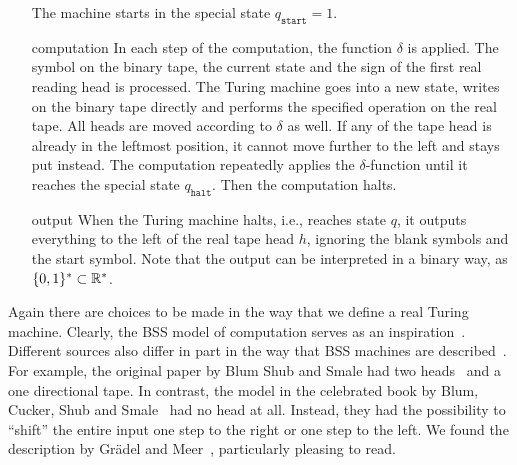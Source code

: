 \documentclass{article}
\begin{document}
\begin{definition}
\begin{itemize}[leftmargin=2cm]
    The machine starts in the special state $q_{\texttt{start}}= 1$.
    \item[computation]
    In each step of the computation, the function $\delta$ is applied.
    The symbol on the binary tape, the current state and the sign of the first real reading head is processed.
    The Turing machine goes into a new state, writes on the binary tape directly and performs the specified operation on the real tape.
    All heads are moved according to $\delta$ as well.
    If any of the tape head is already in the leftmost 
    position, it cannot move further to the left and stays put instead.
    The computation repeatedly applies the $\delta$-function until it reaches the special state $q_\texttt{halt}$.
    Then the computation halts.
    \item[output]
    When the Turing machine halts, i.e., reaches state $q$, it outputs everything to the left of the real tape head $h$, ignoring the blank symbols and the start symbol.
    Note that the output can be interpreted in a binary way, as $\{0,1\}^* \subset \mathbb{R}^*$.
    \end{itemize}
\end{definition}

Again there are choices to be made in the way that we define a real Turing machine.
Clearly, the BSS model of computation serves as an inspiration~\cite{BCSS98}.
Different sources also differ in part in the way that BSS machines are described~\cite{BSS89}.
For example, the original paper by Blum Shub and Smale had two heads~\cite{BSS89} and a one directional tape.
In contrast, the model in the celebrated book by Blum, Cucker, Shub and Smale~\cite{BCSS98} had no head at all.
Instead, they had the possibility to ``shift'' the entire input one step to the right or one step to the left.
We found the description by Gr\"{a}del and Meer~\cite{GM95}, particularly pleasing to read.
\end{document}
